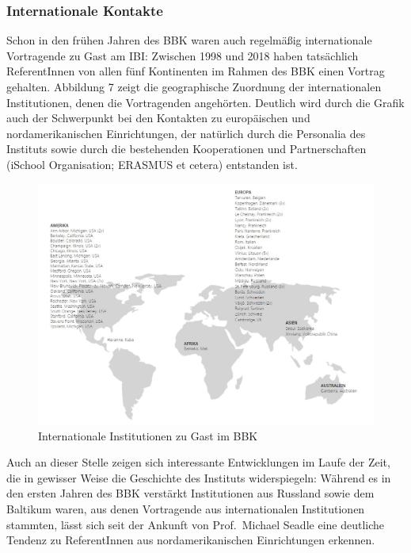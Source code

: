 \documentclass[a4paper,
fontsize=11pt,
oneside,
numbers=noperiodatend,
parskip=half-,
bibliography=totoc,
final
]{scrartcl}
\begin{document}
\hypertarget{internationale-kontakte}{%
\subsubsection{Internationale Kontakte}\label{internationale-kontakte}}

Schon in den frühen Jahren des BBK waren auch regelmäßig internationale
Vortragende zu Gast am IBI: Zwischen 1998 und 2018 haben tatsächlich
ReferentInnen von allen fünf Kontinenten im Rahmen des BBK einen Vortrag
gehalten. Abbildung 7 zeigt die geographische Zuordnung der
internationalen Institutionen, denen die Vortragenden angehörten.
Deutlich wird durch die Grafik auch der Schwerpunkt bei den Kontakten zu
europäischen und nordamerikanischen Einrichtungen, der natürlich durch
die Personalia des Instituts sowie durch die bestehenden Kooperationen
und Partnerschaften (iSchool Organisation; ERASMUS et cetera) entstanden
ist.

\begin{figure}
\centering
\includegraphics[width=14cm]{img/Abbildung7.jpg}
\caption{Internationale Institutionen zu Gast im BBK}
\end{figure}

Auch an dieser Stelle zeigen sich interessante Entwicklungen im Laufe
der Zeit, die in gewisser Weise die Geschichte des Instituts
widerspiegeln: Während es in den ersten Jahren des BBK verstärkt
Institutionen aus Russland sowie dem Baltikum waren, aus denen
Vortragende aus internationalen Institutionen stammten, lässt sich seit
der Ankunft von Prof.~Michael Seadle eine deutliche Tendenz zu
ReferentInnen aus nordamerikanischen Einrichtungen erkennen.
\end{document}
